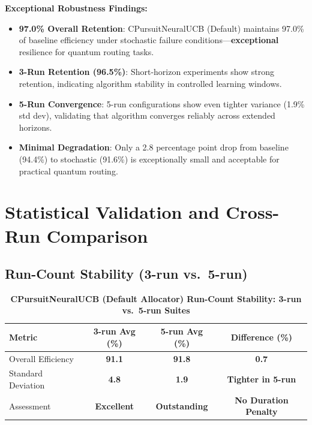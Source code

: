 \documentclass[12pt,a4paper]{article}
\newcommand{\success}[1]{\textcolor{successcolor}{\textbf{#1}}}
\begin{document}
\textbf{Exceptional Robustness Findings:}
\begin{itemize}
\item \success{97.0\% Overall Retention}: CPursuitNeuralUCB (Default) maintains 97.0\% of baseline efficiency under stochastic failure conditions—\textbf{exceptional} resilience for quantum routing tasks.

\item \success{3-Run Retention (96.5\%)}: Short-horizon experiments show strong retention, indicating algorithm stability in controlled learning windows.

\item \success{5-Run Convergence}: 5-run configurations show even tighter variance (1.9\% std dev), validating that algorithm converges reliably across extended horizons.

\item \success{Minimal Degradation}: Only a 2.8 percentage point drop from baseline (94.4\%) to stochastic (91.6\%) is exceptionally small and acceptable for practical quantum routing.
\end{itemize}

\section{Statistical Validation and Cross-Run Comparison}

\subsection{Run-Count Stability (3-run vs.\ 5-run)}

\begin{table}[H]
\centering
\caption{\success{CPursuitNeuralUCB (Default Allocator) Run-Count Stability: 3-run vs.\ 5-run Suites}}
\begin{tabular}{|l|c|c|c|}
\hline
\textbf{Metric} & \textbf{3-run Avg (\%)} & \textbf{5-run Avg (\%)} & \textbf{Difference (\%)} \\
\hline
Overall Efficiency     & \success{91.1} & \success{91.8} & \success{0.7} \\
Standard Deviation     & \success{4.8}  & \success{1.9}  & \success{Tighter in 5-run} \\
Assessment             & \success{Excellent} & \success{Outstanding} & \success{No Duration Penalty} \\
\hline
\end{tabular}
\end{table}
\end{document}
